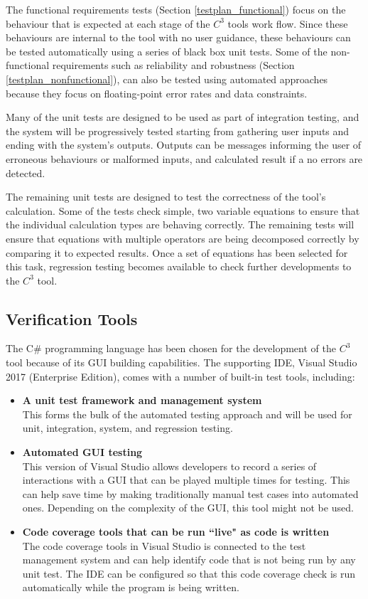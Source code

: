 \documentclass[12pt, titlepage]{article}
\newcommand{\prognameAbbrv}{$C^{3}$}
\begin{document}
The functional requirements tests (Section \ref{testplan_functional}) focus on 
the behaviour that is expected at each stage of the \prognameAbbrv{} tools work 
flow. Since these behaviours are internal to the tool with no user guidance, 
these behaviours can be tested automatically using a series of black box unit 
tests. Some of the non-functional requirements such as reliability and 
robustness (Section \ref{testplan_nonfunctional}), can also be tested using 
automated approaches because they focus on floating-point error rates and data 
constraints.

Many of the unit tests are designed to be used as part of integration testing, 
and the system will be progressively tested starting from gathering user inputs 
and ending with the system's outputs. Outputs can be messages informing the 
user of erroneous behaviours or malformed inputs, and calculated result if a no 
errors are detected.

The remaining unit tests are designed to test the correctness of the tool's 
calculation. Some of the tests check simple, two variable equations to ensure 
that the individual calculation types are behaving correctly. The remaining 
tests will ensure that equations with multiple operators are being decomposed 
correctly by comparing it to expected results. Once a set of equations has been 
selected for this task, regression testing becomes available to check further 
developments to the \prognameAbbrv{} tool.

\subsection{Verification Tools}
The C\# programming language has been chosen for the development of the 
\prognameAbbrv{} tool because of its GUI building capabilities. The supporting 
IDE, Visual Studio 2017 (Enterprise Edition), comes with a number of built-in 
test tools, including:

\begin{itemize}
	\item \textbf{A unit test framework and management system}\\
	This forms the bulk of the automated testing approach and will be used for 
	unit, integration, system, and regression testing.
	\item \textbf{Automated GUI testing}\\
	This version of Visual Studio allows developers to record a series of 
	interactions with a GUI that can be played multiple times for testing. This 
	can help save time by making traditionally manual test cases into automated 
	ones. Depending on the complexity of the GUI, this tool might not be used.
	\item \textbf{Code coverage tools that can be run ``live" as code is 
	written}\\
	The code coverage tools in Visual Studio is connected to the test 
	management system and can help identify code that is not being run by any 
	unit test. The IDE can be configured so that this code coverage check is 
	run automatically while the program is being written.
\end{itemize}
\end{document}
